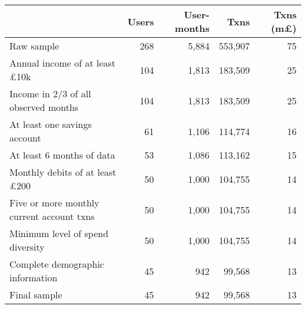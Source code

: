 \begin{tabular}{lrrrr}
\toprule
                                          & Users & User-months &    Txns & Txns (m\pounds) \\
\midrule
                               Raw sample &   268 &       5,884 & 553,907 &              75 \\
     Annual income of at least \pounds10k &   104 &       1,813 & 183,509 &              25 \\
     Income in 2/3 of all observed months &   104 &       1,813 & 183,509 &              25 \\
             At least one savings account &    61 &       1,106 & 114,774 &              16 \\
                At least 6 months of data &    53 &       1,086 & 113,162 &              15 \\
    Monthly debits of at least \pounds200 &    50 &       1,000 & 104,755 &              14 \\
Five or more monthly current account txns &    50 &       1,000 & 104,755 &              14 \\
         Minimum level of spend diversity &    50 &       1,000 & 104,755 &              14 \\
         Complete demographic information &    45 &         942 &  99,568 &              13 \\
                             Final sample &    45 &         942 &  99,568 &              13 \\
\bottomrule
\end{tabular}
